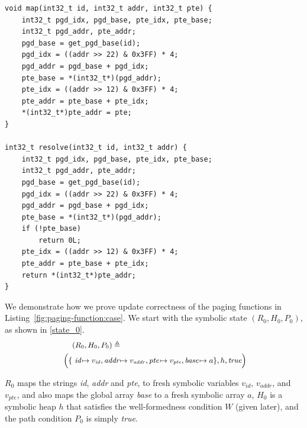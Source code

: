 \begin{listing}
\caption{C-based Examples of Paging Functions.}
\label{fig:paging-function:case}

\begin{verbatim}
void map(int32_t id, int32_t addr, int32_t pte) {
    int32_t pgd_idx, pgd_base, pte_idx, pte_base; 
    int32_t pgd_addr, pte_addr;
    pgd_base = get_pgd_base(id);
    pgd_idx = ((addr >> 22) & 0x3FF) * 4;
    pgd_addr = pgd_base + pgd_idx;
    pte_base = *(int32_t*)(pgd_addr);
    pte_idx = ((addr >> 12) & 0x3FF) * 4;
    pte_addr = pte_base + pte_idx;
    *(int32_t*)pte_addr = pte;
}

int32_t resolve(int32_t id, int32_t addr) {
    int32_t pgd_idx, pgd_base, pte_idx, pte_base;
    int32_t pgd_addr, pte_addr;
    pgd_base = get_pgd_base(id);
    pgd_idx = ((addr >> 22) & 0x3FF) * 4;
    pgd_addr = pgd_base + pgd_idx;
    pte_base = *(int32_t*)(pgd_addr);
    if (!pte_base)
        return 0L;
    pte_idx = ((addr >> 12) & 0x3FF) * 4;
    pte_addr = pte_base + pte_idx;
    return *(int32_t*)pte_addr;
}
\end{verbatim}
\end{listing}



We demonstrate how we prove update correctness of the paging functions in Listing~\ref{fig:paging-function:case}. We start with the symbolic state $(R_0, H_0, P_0)$, as shown in \autoref{state_0}. 
\begin{equation}\
\label{state_0}
\small
\begin{aligned}
&(R_0,H_0,P_0) \triangleq \\
\Big(   \{&\
         \textit{id}\!\mapsto v_{\mathit{id}},
         \textit{addr}\!\mapsto v_{\mathit{addr}},
         \textit{pte}\!\mapsto v_{\mathit{pte}},
         \textit{base}\!\mapsto a\}, h, \textit{true} \Big)
\end{aligned}
\end{equation}


$R_0$
maps the strings \textit{id}, \textit{addr} and \textit{pte}, to fresh symbolic variables $v_{id}$, $v_{addr}$, and $v_{pte}$, and also maps the global array \textit{base} to a fresh symbolic array $a$, $H_0$ is a symbolic heap $h$ that satisfies the 
well-formedness condition $W$ (given later), and the path condition $P_0$ is simply 
\textit{true}. 

